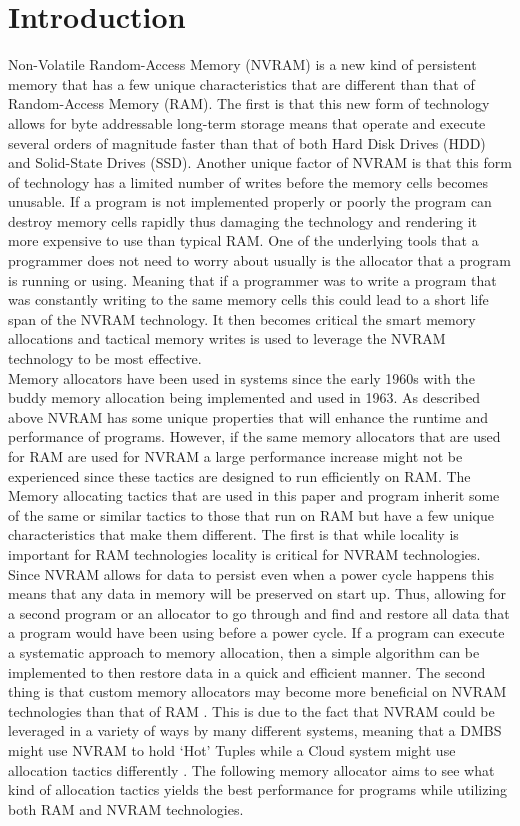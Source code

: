 \documentclass[conference]{IEEEtran}
\begin{document}
\section{Introduction}
Non-Volatile Random-Access Memory (NVRAM) is a new kind of persistent memory that has a few unique characteristics that are different than that of Random-Access Memory (RAM).  The first is that this new form of technology allows for byte addressable long-term storage means that operate and execute several orders of magnitude faster than that of both Hard Disk Drives (HDD) and Solid-State Drives (SSD). Another unique factor of NVRAM is that this form of technology has a limited number of writes before the memory cells becomes unusable. If a program is not implemented properly or poorly the program can destroy memory cells rapidly thus damaging the technology and rendering it more expensive to use than typical RAM. One of the underlying tools that a programmer does not need to worry about usually is the allocator that a program is running or using.  Meaning that if a programmer was to write a program that was constantly writing to the same memory cells this could lead to a short life span of the NVRAM technology. It then becomes critical the smart memory allocations and tactical memory writes is used to leverage the NVRAM technology to be most effective. 
\\
Memory allocators have been used in systems since the early 1960s with the buddy memory allocation being implemented and used in 1963. As described above NVRAM has some unique properties that will enhance the runtime and performance of programs. However, if the same memory allocators that are used for RAM are used for NVRAM a large performance increase might not be experienced since these tactics are designed to run efficiently on RAM. The Memory allocating tactics that are used in this paper and program inherit some of the same or similar tactics to those that run on RAM but have a few unique characteristics that make them different. The first is that while locality is important for RAM technologies locality is critical for NVRAM technologies. Since NVRAM allows for data to persist even when a power cycle happens this means that any data in memory will be preserved on start up. Thus, allowing for a second program or an allocator to go through and find and restore all data that a program would have been using before a power cycle.  If a program can execute a systematic approach to memory allocation, then a simple algorithm can be implemented to then restore data in a quick and efficient manner. The second thing is that custom memory allocators may become more beneficial on NVRAM technologies than that of RAM \cite{berger-oopsla-2002}. This is due to the fact that NVRAM could be leveraged in a variety of ways by many different systems, meaning that a DMBS might use NVRAM to hold ‘Hot’ Tuples while a Cloud system might use allocation tactics differently \cite{Arulrajdbms}.  The following memory allocator aims to see what kind of allocation tactics yields the best performance for programs while utilizing both RAM and NVRAM technologies. 
\end{document}
